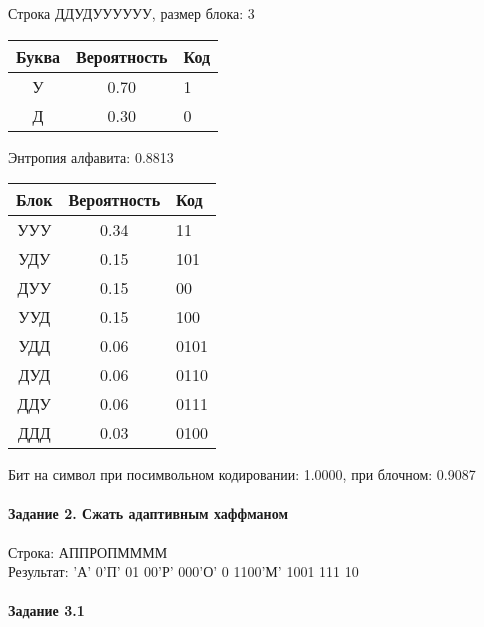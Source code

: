 \documentclass[a4paper, 12pt]{article}
\begin{document}
Строка ДДУДУУУУУУ, размер блока: 3
\begin{center}
 \begin{tabular}{ |c|c|l| } 
  \hline
     Буква & Вероятность & Код\\ \hline
У & 0.70 & 1\\\hline
Д & 0.30 & 0
\\ \hline \end{tabular}
\end{center}
Энтропия алфавита: 0.8813
\begin{center}
 \begin{tabular}{ |c|c|l| } 
  \hline
     Блок & Вероятность & Код\\ \hline
УУУ & 0.34 & 11\\\hline
УДУ & 0.15 & 101\\\hline
ДУУ & 0.15 & 00\\\hline
УУД & 0.15 & 100\\\hline
УДД & 0.06 & 0101\\\hline
ДУД & 0.06 & 0110\\\hline
ДДУ & 0.06 & 0111\\\hline
ДДД & 0.03 & 0100
\\ \hline \end{tabular}
\end{center}
Бит на символ при посимвольном кодировании: 1.0000, при блочном: 0.9087


\pagebreak
\paragraph{Задание 2. Сжать адаптивным хаффманом\\}

Строка: 
АППРОПММММ\\
Результат: 'А' 0'П' 01 00'Р' 000'О' 0 1100'М' 1001 111 10










\pagebreak
\paragraph{Задание 3.1}
\end{document}
